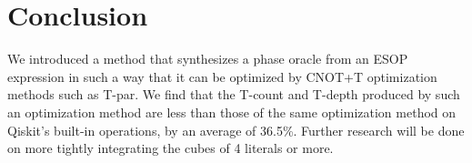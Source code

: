\section{Conclusion}
\label{Conc}

We introduced a method that synthesizes a phase oracle from an ESOP expression in such a way that it can be optimized by CNOT+T optimization methods such as T-par. We find that the T-count and T-depth produced by such an optimization method are less than those of the same optimization method on Qiskit's built-in operations, by an average of 36.5\%. Further research will be done on more tightly integrating the cubes of 4 literals or more.
